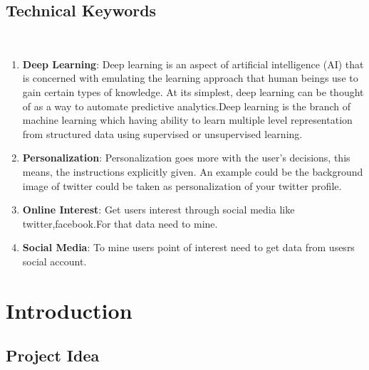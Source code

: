 \documentclass[11pt,fleqn]{book} %
\begin{document}
\section{Technical Keywords}\
\begin{enumerate}
    \item \textbf{\LARGE\color{ocre}Deep Learning}:  Deep learning is an aspect of artificial intelligence (AI) that is concerned with emulating the learning approach that human beings use to gain certain types of knowledge. At its simplest, deep learning can be thought of as a way to automate predictive analytics.Deep learning is the branch of machine learning which having ability to learn multiple level representation from structured data using supervised or unsupervised learning.
    \vspace{2mm}
    \item \textbf{\LARGE\color{ocre}Personalization}: Personalization goes more with the user's decisions, this means, the instructions explicitly given. An example could be the background image of twitter could be taken as personalization of your twitter profile.
    \vspace{2mm}
	\item \textbf{\LARGE\color{ocre}Online Interest}: Get users interest through social media like twitter,facebook.For that data need to mine.
	\vspace{2mm}
	\item \textbf{\LARGE\color{ocre}Social Media}: To  mine users point of interest need to get data from usesrs social account.

 \end{enumerate}


\chapter{Introduction}

\section{Project Idea}

    
    
\end{document}
